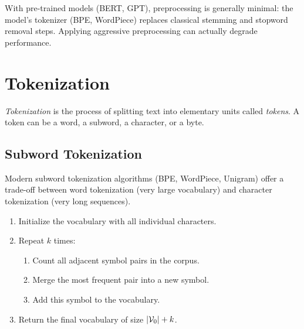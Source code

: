 \begin{warning}[title=\textbf{Preprocessing and modern models}]
With pre-trained models (BERT, GPT), preprocessing is generally minimal: the
model's tokenizer (BPE, WordPiece) replaces classical stemming and stopword
removal steps. Applying aggressive preprocessing can actually degrade
performance.
\end{warning}

\section{Tokenization}
\label{sec:intro:tokenization}

\begin{definition}[Tokenization]
\emph{Tokenization} is the process of splitting text into elementary units
called \emph{tokens}. A token can be a word, a subword, a character, or a byte.
\end{definition}

\subsection{Subword Tokenization}

Modern subword tokenization algorithms (BPE, WordPiece, Unigram) offer a
trade-off between word tokenization (very large vocabulary) and character
tokenization (very long sequences).

\begin{algorithme}[title=\textbf{Byte Pair Encoding (BPE)}]
\begin{enumerate}
    \item Initialize the vocabulary with all individual characters.
    \item Repeat $k$ times:
    \begin{enumerate}
        \item Count all adjacent symbol pairs in the corpus.
        \item Merge the most frequent pair into a new symbol.
        \item Add this symbol to the vocabulary.
    \end{enumerate}
    \item Return the final vocabulary of size $\left| \mathcal{V}_0 \right| + k$.
\end{enumerate}
\end{algorithme}

